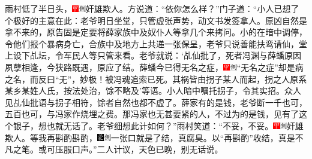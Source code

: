 雨村低了半日头，{\includegraphics[width=3mm]{../Images/00002}\includegraphics[width=3mm]{../Images/00011}\footnotesize \kaishu 奸雄欺人。}方说道：“依你怎么样？”门子道：“小人已想了个极好的主意在此：老爷明日坐堂，只管虚张声势，动文书发签拿人。原凶自然是拿不来的，原告固是定要将薛家族中及奴仆人等拿几个来拷问。小的在暗中调停，令他们报个暴病身亡，合族中及地方上共递一张保呈，老爷只说善能扶鸾请仙，堂上设下乩坛，令军民人等只管来看。老爷就说：‘乩仙批了，死者冯渊与薛蟠原因夙孽相逢，今狭路既遇，原应了结。薛蟠今已得无名之症，{\includegraphics[width=3mm]{../Images/00002}\includegraphics[width=3mm]{../Images/00011}\footnotesize \kaishu “无名之症”却是病之名，而反曰“无”，妙极！}被冯魂追索已死。其祸皆由拐子某人而起，拐之人原系某乡某姓人氏，按法处治，馀不略及’等语。小人暗中嘱托拐子，令其实招。众人见乩仙批语与拐子相符，馀者自然也都不虚了。薛家有的是钱，老爷断一千也可，五百也可，与冯家作烧埋之费。那冯家也无甚要紧的人，不过为的是钱，见有了这个银子，想也就无话了。老爷细想此计如何？”雨村笑道：“不妥，不妥。{\includegraphics[width=3mm]{../Images/00002}\includegraphics[width=3mm]{../Images/00011}\footnotesize \kaishu 奸雄欺人。}等我再斟酌斟酌，{\includegraphics[width=3mm]{../Images/00006}\includegraphics[width=3mm]{../Images/00011}\footnotesize \kaishu 一张口就是了结，真腐臭。以“再斟酌”收结，真是不凡之笔。}或可压服口声。”二人计议，天色已晚，别无话说。

